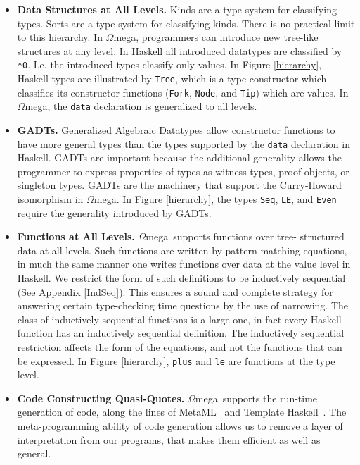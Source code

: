 \documentclass[11pt,twoside,A4]{llncs}
\newcommand{\om}{\emph{$\Omega$}mega}
\begin{document}
\begin{itemize}

\item{\bf Data Structures at All Levels.} Kinds are a type system
for classifying types. Sorts are a type system for classifying
kinds. There is no practical limit to this hierarchy. In \om,
programmers can introduce new tree-like structures at any level. In
Haskell all introduced datatypes are classified by \verb+*0+. I.e.
the introduced types classify only values. In Figure \ref{hierarchy},
Haskell types are illustrated by {\tt Tree}, which is a type
constructor which classifies its constructor functions ({\tt Fork},
{\tt Node}, and {\tt Tip}) which are values. In \om, the {\tt data}
declaration is generalized to all levels.

\item{\bf GADTs.} Generalized Algebraic Datatypes allow constructor
functions to have more general types than the types supported by the
\verb+data+ declaration in Haskell. GADTs are important because the
additional generality allows the programmer to express properties of
types as witness types, proof objects, or singleton types. GADTs are
the machinery that support the Curry-Howard isomorphism in \om.
In Figure \ref{hierarchy}, the types {\tt Seq},
{\tt LE}, and {\tt Even} require the generality introduced by GADTs.


\item{\bf Functions at All Levels.} \om\ supports functions over
tree- structured data at all levels. Such functions are written
by pattern matching equations, in much the same manner one writes
functions over data at the value level in Haskell. We restrict the
form of such definitions to be inductively sequential (See Appendix \ref{IndSeq}). This ensures
a sound and complete strategy for answering certain type-checking
time questions by the use of narrowing. The class of inductively
sequential functions is a large one, in fact every Haskell function
has an inductively sequential definition. The inductively sequential
restriction affects the form of the equations, and not the functions
that can be expressed. In Figure \ref{hierarchy}, {\tt plus} 
and {\tt le} are functions at the type level.

\item{\bf Code Constructing Quasi-Quotes.}  \om\
supports the run-time generation of code, along the lines of
MetaML~\cite{Sheard:1999:UMS} and Template Haskell~\cite{Sheard02}. The meta-programming ability of
code generation allows us to remove a layer of interpretation
from our programs, that makes them efficient as well as
general.

\end{itemize}
\end{document}
